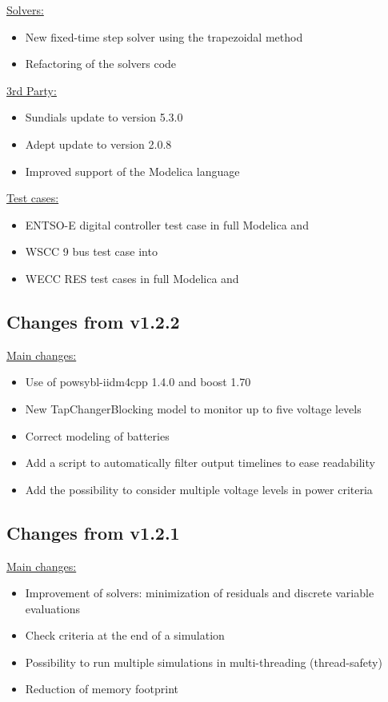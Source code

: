 \documentclass[a4paper, 12pt]{report}
\begin{document}
\underline{Solvers:}
\begin{itemize}
\item New fixed-time step solver using the trapezoidal method
\item Refactoring of the solvers code
\end{itemize}

\underline{3rd Party:}
\begin{itemize}
\item Sundials update to version 5.3.0
\item Adept update to version 2.0.8
\item Improved support of the Modelica language
\end{itemize}

\underline{Test cases:}
\begin{itemize}
\item ENTSO-E digital controller test case in full Modelica and \Dynawo
\item WSCC 9 bus test case into \Dynawo
\item WECC RES test cases in full Modelica and \Dynawo
\end{itemize}


\subsection{Changes from v1.2.2}

\underline{Main changes:}
\begin{itemize}
\item Use of powsybl-iidm4cpp 1.4.0 and boost 1.70
\item New TapChangerBlocking model to monitor up to five voltage levels
\item Correct modeling of batteries
\item Add a script to automatically filter output timelines to ease readability
\item Add the possibility to consider multiple voltage levels in power criteria
\end{itemize}

\subsection{Changes from v1.2.1}

\underline{Main changes:}
\begin{itemize}
\item Improvement of solvers: minimization of residuals and discrete variable evaluations
\item Check criteria at the end of a simulation
\item Possibility to run multiple simulations in multi-threading (thread-safety)
\item Reduction of memory footprint
\end{itemize}
\end{document}
